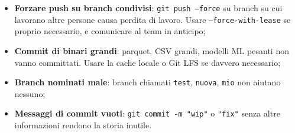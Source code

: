 \begin{itemize}
  \item \textbf{Forzare push su branch condivisi}: \texttt{git push --force} su branch su cui lavorano altre persone causa perdita di lavoro. Usare \texttt{--force-with-lease} se proprio necessario, e comunicare al team in anticipo;
  \item \textbf{Commit di binari grandi}: parquet, CSV grandi, modelli ML pesanti non vanno committati. Usare la cache locale o Git LFS se davvero necessario;
  \item \textbf{Branch nominati male}: branch chiamati \texttt{test}, \texttt{nuova}, \texttt{mio} non aiutano nessuno;
  \item \textbf{Messaggi di commit vuoti}: \texttt{git commit -m "wip"} o \texttt{"fix"} senza altre informazioni rendono la storia inutile.
\end{itemize}
